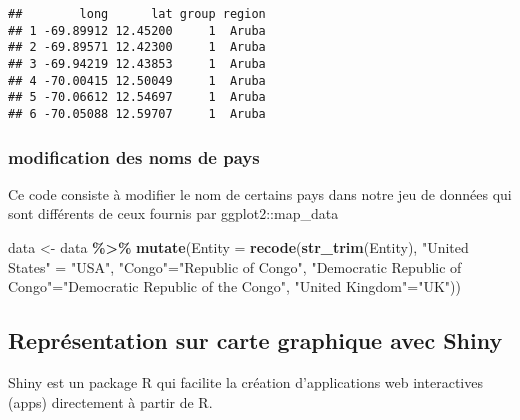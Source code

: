 \documentclass[
]{article}
\newenvironment{Shaded}{\begin{snugshade}}{\end{snugshade}}
\newcommand{\AttributeTok}[1]{\textcolor[rgb]{0.13,0.29,0.53}{#1}}
\newcommand{\FunctionTok}[1]{\textcolor[rgb]{0.13,0.29,0.53}{\textbf{#1}}}
\newcommand{\NormalTok}[1]{#1}
\newcommand{\OtherTok}[1]{\textcolor[rgb]{0.56,0.35,0.01}{#1}}
\newcommand{\SpecialCharTok}[1]{\textcolor[rgb]{0.81,0.36,0.00}{\textbf{#1}}}
\newcommand{\StringTok}[1]{\textcolor[rgb]{0.31,0.60,0.02}{#1}}
\begin{document}
\begin{verbatim}
##        long      lat group region
## 1 -69.89912 12.45200     1  Aruba
## 2 -69.89571 12.42300     1  Aruba
## 3 -69.94219 12.43853     1  Aruba
## 4 -70.00415 12.50049     1  Aruba
## 5 -70.06612 12.54697     1  Aruba
## 6 -70.05088 12.59707     1  Aruba
\end{verbatim}

\hypertarget{modification-des-noms-de-pays}{%
\subsubsection{modification des noms de
pays}\label{modification-des-noms-de-pays}}

Ce code consiste à modifier le nom de certains pays dans notre jeu de
données qui sont différents de ceux fournis par ggplot2::map\_data

\begin{Shaded}
\begin{Highlighting}[]
\NormalTok{data }\OtherTok{\textless{}{-}}\NormalTok{ data }\SpecialCharTok{\%\textgreater{}\%} 
  \FunctionTok{mutate}\NormalTok{(}\AttributeTok{Entity =} \FunctionTok{recode}\NormalTok{(}\FunctionTok{str\_trim}\NormalTok{(Entity), }\StringTok{"United States"} \OtherTok{=} \StringTok{"USA"}\NormalTok{,}
                         \StringTok{"Congo"}\OtherTok{=}\StringTok{"Republic of Congo"}\NormalTok{,}
                         \StringTok{"Democratic Republic of Congo"}\OtherTok{=}\StringTok{"Democratic Republic of the Congo"}\NormalTok{,}
                         \StringTok{"United Kingdom"}\OtherTok{=}\StringTok{"UK"}\NormalTok{))}
\end{Highlighting}
\end{Shaded}

\hypertarget{repruxe9sentation-sur-carte-graphique-avec-shiny}{%
\subsection{Représentation sur carte graphique avec
Shiny}\label{repruxe9sentation-sur-carte-graphique-avec-shiny}}

Shiny est un package R qui facilite la création d'applications web
interactives (apps) directement à partir de R.
\end{document}
